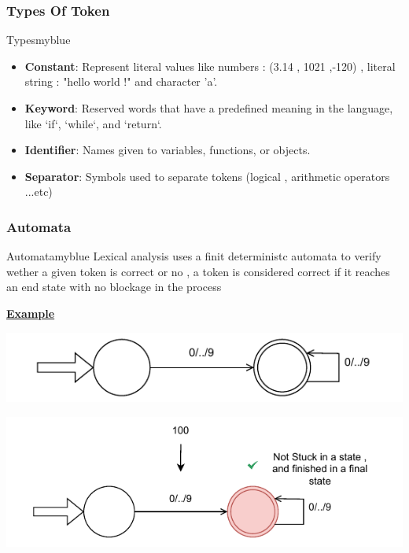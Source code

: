 \subsubsection{Types Of Token}
\begin{prettyBox}{Types}{myblue}
\begin{itemize}
    \item \textbf{Constant}: Represent literal values like numbers : (3.14 , 1021 ,-120)  , literal string : "hello world !" and character 'a'.  
    \item \textbf{Keyword}:  Reserved words that have a predefined meaning in the language, like `if`, `while`, and `return`.  
    \item \textbf{Identifier}: Names given to variables, functions, or objects.  
    \item \textbf{Separator}: Symbols used to separate tokens (logical , arithmetic operators ...etc) 
\end{itemize}
\end{prettyBox}

\vspace{0.35cm}


\subsubsection{Automata}
\begin{prettyBox}{Automata}{myblue}
Lexical analysis uses a finit deterministc automata to verify wether a given token is correct or no , a token
is considered correct if it reaches an end state with no blockage in the process
\end{prettyBox}

\newpage
\null

\textbf{\underline{Example}}

\vspace{0.5cm}

\hspace{5.7cm}    \includegraphics{Chapters/Examples/Intro/ex4.1.drawio.pdf}


\vspace{0.85cm}

 \hspace{5.65cm}   \includegraphics{Chapters/Examples/Intro/ex4.2.drawio.pdf}


